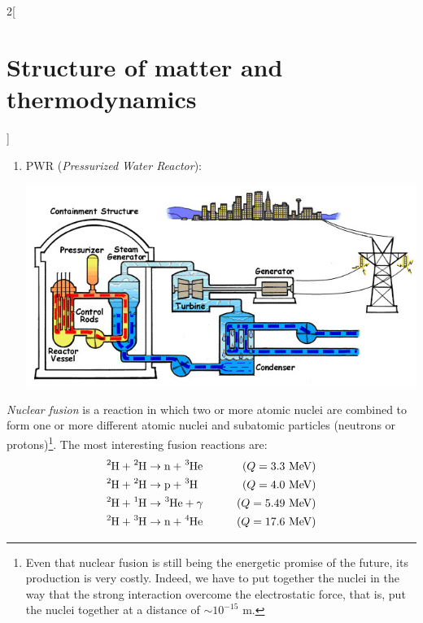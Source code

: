 \documentclass[../../../main.tex]{subfiles}
\begin{document}
\begin{multicols}{2}[\section{Structure of matter and thermodynamics}]
\begin{definition}
\begin{enumerate}
\begin{center}
\begin{minipage}{\linewidth}
                      \end{minipage}
                  \end{center}
            \item PWR (\textit{Pressurized Water Reactor}):
                  \begin{center}
                      \begin{minipage}{\linewidth}
                          \centering
                          \includegraphics[width=\linewidth]{Images/pwr.jpg}
                      \end{minipage}
                  \end{center}
        \end{enumerate}
    \end{definition}
    \begin{definition}
        \textit{Nuclear fusion} is a reaction in which two or more atomic nuclei are combined to form one or more different atomic nuclei and subatomic particles (neutrons or protons)\footnote{Even that nuclear fusion is still being the energetic promise of the future, its production is very costly. Indeed, we have to put together the nuclei in the way that the strong interaction overcome the electrostatic force, that is, put the nuclei together at a distance of $\sim 10^{-15}\text{ m}$.}. The most interesting fusion reactions are:
        \begin{align*}
            \ce{^2H}+\ce{^2H} & \rightarrow\text{n}+\ce{^3He}\qquad & (Q=3.3\text{ MeV})  \\
            \ce{^2H}+\ce{^2H} & \rightarrow\text{p}+\ce{^3H}\qquad  & (Q=4.0\text{ MeV})  \\
            \ce{^2H}+\ce{^1H} & \rightarrow\ce{^3He}+\gamma\qquad   & (Q=5.49\text{ MeV}) \\
            \ce{^2H}+\ce{^3H} & \rightarrow\text{n}+\ce{^4He}\qquad & (Q=17.6\text{ MeV})
        \end{align*}
    \end{definition}

\end{multicols}
\end{document}
